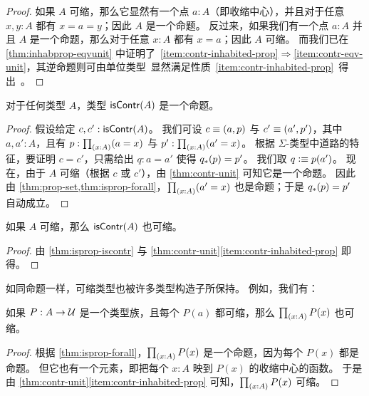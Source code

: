 \begin{proof}
  如果 $A$ 可缩，那么它显然有一个点 $a:A$（即收缩中心），并且对于任意 $x,y:A$ 都有 $x=a=y$；因此 $A$ 是一个命题。
  反过来，如果我们有一个点 $a:A$ 并且 $A$ 是一个命题，那么对于任意 $x:A$ 都有 $x=a$；因此 $A$ 可缩。
  而我们已在 \cref{thm:inhabprop-eqvunit} 中证明了~\ref{item:contr-inhabited-prop}$\Rightarrow$\ref{item:contr-eqv-unit}，其逆命题则可由单位类型~\unit 显然满足性质~\ref{item:contr-inhabited-prop} 得出。
\end{proof}

\begin{lem}\label{thm:isprop-iscontr}
  对于任何类型 $A$，类型 $\mathsf{isContr}(A)$ 是一个命题。
\end{lem}

\begin{proof}
  假设给定 $c,c':\mathsf{isContr}(A)$。
  我们可设 $c\equiv(a,p)$ 与 $c'\equiv(a',p')$，其中 $a,a':A$，且有 $p:\prd{x:A} (a=x)$ 与 $p':\prd{x:A} (a'=x)$。
  根据 $\Sigma$-类型中道路的特征，要证明 $c=c'$，只需给出 $q:a=a'$ 使得 ${q}_{*}\mathopen{}\left({p}\right)\mathclose{}=p'$。
  我们取 $q\vcentcolon\equiv p(a')$。
  现在，由于 $A$ 可缩（根据 $c$ 或 $c'$），由 \cref{thm:contr-unit} 可知它是一个命题。
  因此由 \cref{thm:prop-set,thm:isprop-forall}，$\prd{x:A}(a'=x)$ 也是命题；于是 ${q}_{*}\mathopen{}\left({p}\right)\mathclose{}=p'$ 自动成立。
\end{proof}

\begin{cor}\label{thm:contr-contr}
  如果 $A$ 可缩，那么 $\mathsf{isContr}(A)$ 也可缩。
\end{cor}

\begin{proof}
  由 \cref{thm:isprop-iscontr} 与 \cref{thm:contr-unit}\ref{item:contr-inhabited-prop} 即得。
\end{proof}

如同命题一样，可缩类型也被许多类型构造子所保持。
例如，我们有：

\begin{lem}\label{thm:contr-forall}
  如果 $P:A\to\mathcal{U}$ 是一个类型族，且每个 $P(a)$ 都可缩，那么 $\prd{x:A} P(x)$ 也可缩。
\end{lem}

\begin{proof}
  根据 \cref{thm:isprop-forall}，$\prd{x:A} P(x)$ 是一个命题，因为每个 $P(x)$ 都是命题。
  但它也有一个元素，即把每个 $x:A$ 映到 $P(x)$ 的收缩中心的函数。
  于是由 \cref{thm:contr-unit}\ref{item:contr-inhabited-prop} 可知，$\prd{x:A} P(x)$ 可缩。
\end{proof}

